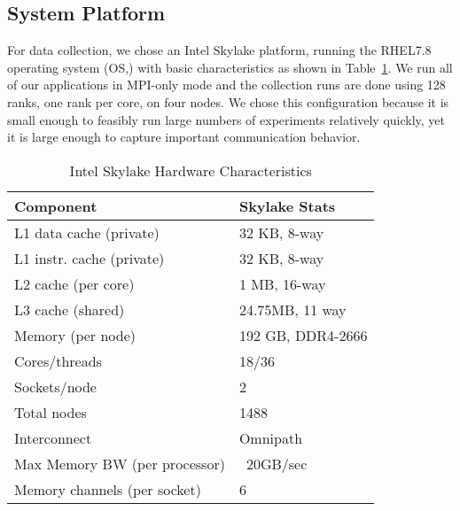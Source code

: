 \subsection{System Platform}
For data collection, we chose an Intel Skylake platform,
running the RHEL7.8 operating system (OS,)
with basic characteristics as shown in Table~\ref{tab:platformSpecs}.
We run all of our applications in MPI-only mode and the collection
runs are done using 128 ranks, one rank per core, on four nodes.
We chose this configuration because it is small enough to feasibly 
run large numbers of experiments relatively quickly, yet it is large 
enough to capture important communication behavior.
\begin{table}
   \begin{center}
      \caption{Intel Skylake Hardware Characteristics}
      \label{tab:platformSpecs}
    \footnotesize
      \begin{tabular}{ll} 
      \toprule
      \textbf{Component}                   & \textbf{Skylake Stats}           \\ 
      \midrule
      L1 data cache (private) & 32 KB, 8-way  \\ 
      L1 instr. cache (private) & 32 KB, 8-way\\ 
      L2 cache (per core)             & 1 MB, 16-way \\
      L3 cache (shared)     & 24.75MB, 11 way \\
      Memory (per node)        & 192 GB, DDR4-2666         \\
      Cores/threads        & 18/36 \\ 
      Sockets/node         &  2 \\ 
      Total nodes          &1488 \\ 
      Interconnect  & Omnipath \\ 
      Max Memory BW (per processor)   &  ~20GB/sec       \\ 
      Memory channels (per socket)            & 6           \\ 
      \bottomrule
      \end{tabular}
   \end{center}
\end{table}

